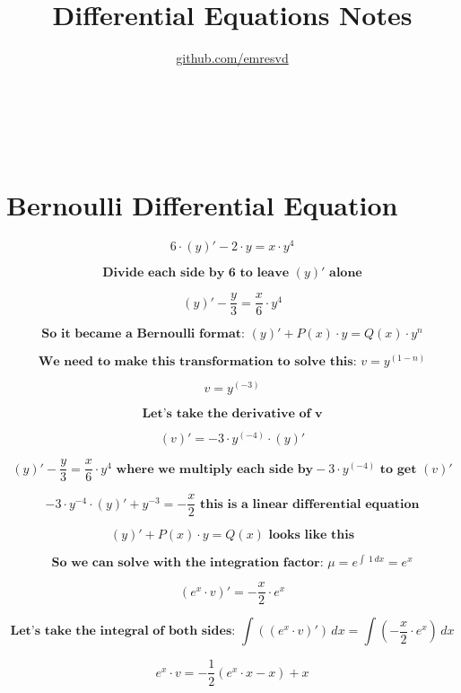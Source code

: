 \documentclass{article}
\title{Differential Equations Notes}
\author{\href{https://github.com/emresvd}{github.com/emresvd}}
\begin{document}
\maketitle

\tableofcontents
\\~\\

\section{Bernoulli Differential Equation}
    \[
    6 \cdot \left(y\right)' - 2 \cdot y = x \cdot y^4
    \]
    
    \[
    \textbf{Divide each side by 6 to leave } \left(y\right)' \textbf{ alone}
    \]
    
    \[
    \left(y\right)' - \frac{y}{3} = \frac{x}{6} \cdot y^4
    \]
    
    \[
    \textbf{So it became a Bernoulli format: } \left(y\right)' + P(x) \cdot y = Q(x) \cdot y^n
    \]
    
    \[
    \textbf{We need to make this transformation to solve this: } v = y^{(1-n)}
    \]
    
    \[
    v = y^{(-3)}
    \]
    
    \[
    \textbf{Let's take the derivative of v}
    \]
    
    \[
    \left(v\right)' = -3 \cdot y^{(-4)} \cdot \left(y\right)'
    \]
    
    \[
    \left(y\right)' - \frac{y}{3} = \frac{x}{6} \cdot y^4 \textbf{ where we multiply each side by} -3 \cdot y^{(-4)} \textbf{ to get } \left(v\right)'
    \]
    
    \[
    -3 \cdot y^{-4} \cdot \left(y\right)' + y^{-3} = -\frac{x}{2} \textbf{ this is a linear differential equation}
    \]
    
    \[
    \left(y\right)' + P(x) \cdot y = Q(x) \textbf{ looks like this}
    \]
    
    \[
    \textbf{So we can solve with the integration factor: } \mu = e^{\int \:1 \, dx} = e^x
    \]
    
    \[
    \left(e^x \cdot v\right)' = -\frac{x}{2} \cdot e^x
    \]
    
    \[
    \textbf{Let's take the integral of both sides: } \int \left(\left(e^x \cdot v\right)'\right) \, dx = \int \left(-\frac{x}{2} \cdot e^x\right) \, dx
    \]
    
    \[
    e^x \cdot v = -\frac{1}{2} \left(e^x \cdot x - x\right) + x
    \]
    
\end{document}

